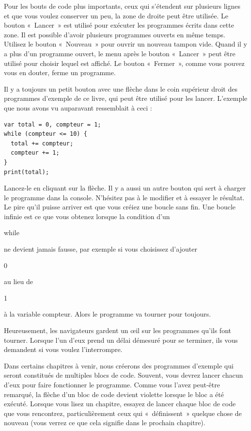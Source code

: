 \documentclass{FramateX}
\renewcommand{\texttt}[1]{\begin{sffamily}{#1}\end{sffamily}}
\begin{document}
Pour les bouts de code plus importants, ceux qui s'étendent sur
plusieurs lignes et que vous voulez conserver un peu, la zone de droite
peut être utilisée. Le bouton «~Lancer~» est utilisé pour exécuter les
programmes écrits dans cette zone. Il est possible d'avoir plusieurs
programmes ouverts en même temps. Utilisez le bouton «~Nouveau~» pour
ouvrir un nouveau tampon vide. Quand il y a plus d'un programme ouvert,
le menu après le bouton «~Lancer~» peut être utilisé pour choisir lequel
est affiché. Le bouton «~Fermer~», comme vous pouvez vous en douter,
ferme un programme.

Il y a toujours un petit bouton avec une flèche dans le coin supérieur
droit des programmes d'exemple de ce livre, qui peut être utilisé pour
les lancer. L'exemple que nous avons vu auparavant ressemblait à ceci :

\begin{lstlisting}
var total = 0, compteur = 1;
while (compteur <= 10) {
  total += compteur;
  compteur += 1;
}
print(total);
\end{lstlisting}
Lancez-le en cliquant sur la flèche. Il y a aussi un autre bouton qui
sert à charger le programme dans la console. N'hésitez pas à le modifier
et à essayer le résultat. Le pire qu'il puisse arriver est que vous
créiez une boucle sans fin. Une boucle infinie est ce que vous obtenez
lorsque la condition d'un \texttt{while} ne devient jamais fausse, par
exemple si vous choisissez d'ajouter \texttt{0} au lieu de \texttt{1} à
la variable compteur. Alors le programme va tourner pour toujours.

Heureusement, les navigateurs gardent un œil sur les programmes qu'ils
font tourner. Lorsque l'un d'eux prend un délai démesuré pour se
terminer, ils vous demandent si vous voulez l'interrompre.

\begin{center}\end{center}

Dans certains chapitres à venir, nous créerons des programmes d'exemple
qui seront constitués de multiples blocs de code. Souvent, vous devrez
lancer chacun d'eux pour faire fonctionner le programme. Comme vous
l'avez peut-être remarqué, la flèche d'un bloc de code devient violette
lorsque le bloc a été exécuté. Lorsque vous lisez un chapitre, essayez
de lancer chaque bloc de code que vous rencontrez, particulièrement ceux
qui «~définissent~» quelque chose de nouveau (vous verrez ce que cela
signifie dans le prochain chapitre).
\end{document}
